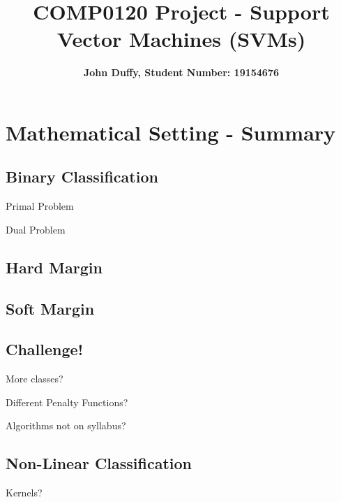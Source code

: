 \documentclass[10pt, a4paper]{amsart}
\title{COMP0120 Project - Support Vector Machines (SVM\MakeLowercase{s})}
\author{\textbf{John Duffy, Student Number: 19154676}}
\begin{document}
\maketitle

\section{Mathematical Setting - Summary}

\subsection{Binary Classification}\hfill

Primal Problem


%

Dual Problem

\subsection{Hard Margin}

\subsection{Soft Margin}

\subsection{Challenge!}\hfill

More classes?

Different Penalty Functions?

Algorithms not on syllabus?

\subsection{Non-Linear Classification}\hfill

Kernels?
\end{document}

